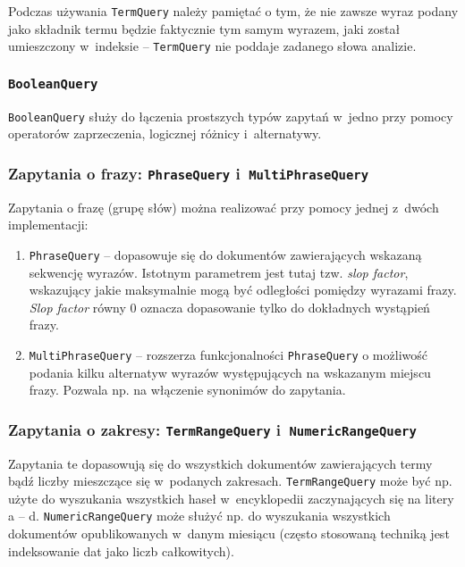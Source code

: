 Podczas używania \texttt{TermQuery} należy pamiętać o tym, że nie zawsze wyraz podany jako składnik termu będzie faktycznie tym samym wyrazem, jaki został umieszczony w~indeksie -- \texttt{TermQuery} nie poddaje zadanego słowa analizie.

\subsubsection{\texttt{BooleanQuery}}

\texttt{BooleanQuery} służy do łączenia prostszych typów zapytań w~jedno przy pomocy operatorów zaprzeczenia, logicznej różnicy i~alternatywy. 

\subsubsection{Zapytania o frazy: \texttt{PhraseQuery} i~\texttt{MultiPhraseQuery}}

Zapytania o frazę (grupę słów) można realizować przy pomocy jednej z~dwóch implementacji:
\begin{enumerate}
 \item \texttt{PhraseQuery} -- dopasowuje się do dokumentów zawierających wskazaną sekwencję wyrazów. Istotnym parametrem jest tutaj tzw. \emph{slop factor}, wskazujący jakie maksymalnie mogą być odległości pomiędzy wyrazami frazy. \emph{Slop factor} równy 0 oznacza dopasowanie tylko do dokładnych wystąpień frazy. 
 \item \texttt{MultiPhraseQuery} -- rozszerza funkcjonalności \texttt{PhraseQuery} o możliwość podania kilku alternatyw wyrazów występujących na wskazanym miejscu frazy. Pozwala np. na włączenie synonimów do zapytania. 
\end{enumerate}

\subsubsection{Zapytania o zakresy: \texttt{TermRangeQuery} i~\texttt{NumericRangeQuery}}

Zapytania te dopasowują się do wszystkich dokumentów zawierających termy bądź liczby mieszczące się w~podanych zakresach. \texttt{TermRangeQuery} może być np. użyte do wyszukania wszystkich haseł w~encyklopedii zaczynających się na litery a -- d. \texttt{NumericRangeQuery} może służyć np. do wyszukania wszystkich dokumentów opublikowanych w~danym miesiącu (często stosowaną techniką jest indeksowanie dat jako liczb całkowitych).

